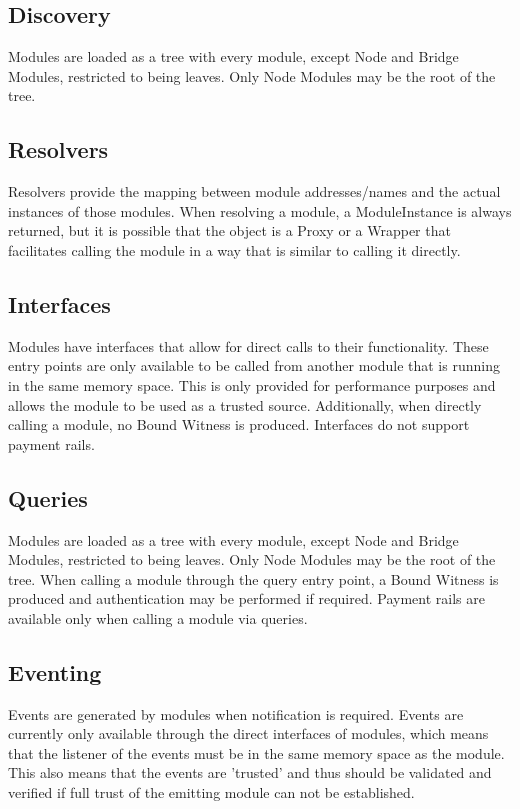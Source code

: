 \documentclass{article}
\begin{document}
\subsection{Discovery}
Modules are loaded as a tree with every module, except Node and Bridge Modules, restricted to being leaves.  Only Node Modules may be the root of the tree.

\subsection{Resolvers}
Resolvers provide the mapping between module addresses/names and the actual instances of those modules.  When resolving a module, a ModuleInstance is always returned, but it is possible that the object is a Proxy or a Wrapper that facilitates calling the module in a way that is similar to calling it directly.

\subsection{Interfaces}
Modules have interfaces that allow for direct calls to their functionality.  These entry points are only available to be called from another module that is running in the same memory space.  This is only provided for performance purposes and allows the module to be used as a trusted source.  Additionally, when directly calling a module, no Bound Witness is produced.  Interfaces do not support payment rails.

\subsection{Queries}
Modules are loaded as a tree with every module, except Node and Bridge Modules, restricted to being leaves.  Only Node Modules may be the root of the tree.  When calling a module through the query entry point, a Bound Witness is produced and authentication may be performed if required.  Payment rails are available only when calling a module via queries.

\subsection{Eventing}
Events are generated by modules when notification is required.  Events are currently only available through the direct interfaces of modules, which means that the listener of the events must be in the same memory space as the module.  This also means that the events are 'trusted' and thus should be validated and verified if full trust of the emitting module can not be established. 
\end{document}
